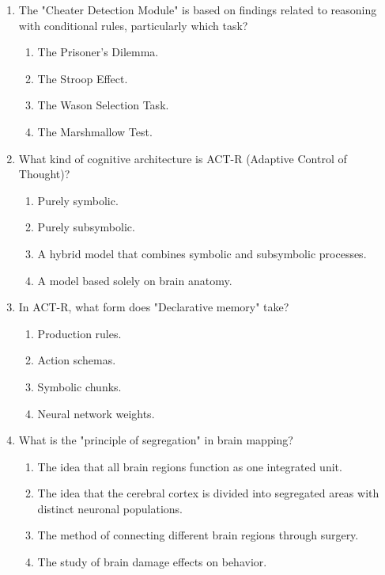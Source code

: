\documentclass{article}
\begin{document}
\begin{enumerate}[label=\arabic*.]
\item The "Cheater Detection Module" is based on findings related to reasoning with conditional rules, particularly which task?
\begin{enumerate}[label=(\alph*)]
    \item The Prisoner's Dilemma.
    \item The Stroop Effect.
    \item The Wason Selection Task.
    \item The Marshmallow Test.
\end{enumerate}

\item What kind of cognitive architecture is ACT-R (Adaptive Control of Thought)?
\begin{enumerate}[label=(\alph*)]
    \item Purely symbolic.
    \item Purely subsymbolic.
    \item A hybrid model that combines symbolic and subsymbolic processes.
    \item A model based solely on brain anatomy.
\end{enumerate}

\item In ACT-R, what form does "Declarative memory" take?
\begin{enumerate}[label=(\alph*)]
    \item Production rules.
    \item Action schemas.
    \item Symbolic chunks.
    \item Neural network weights.
\end{enumerate}

\item What is the "principle of segregation" in brain mapping?
\begin{enumerate}[label=(\alph*)]
    \item The idea that all brain regions function as one integrated unit.
    \item The idea that the cerebral cortex is divided into segregated areas with distinct neuronal populations.
    \item The method of connecting different brain regions through surgery.
    \item The study of brain damage effects on behavior.
\end{enumerate}


\end{enumerate}
\end{document}
